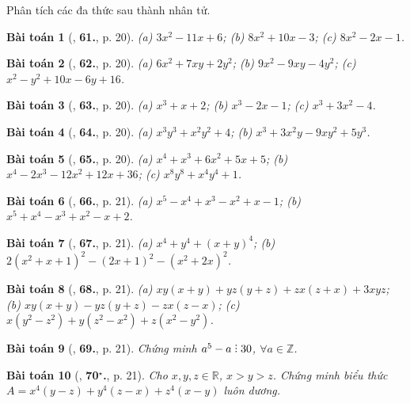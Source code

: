 \documentclass{article}
\numberwithin{equation}{section}
\newtheorem{baitoan}{Bài toán}
\DeclareRobustCommand{\divby}{%
	\mathrel{\vbox{\baselineskip.65ex\lineskiplimit0pt\hbox{.}\hbox{.}\hbox{.}}}%
}
\begin{document}
Phân tích các đa thức sau thành nhân tử.

\begin{baitoan}[\cite{Tuyen_Toan_8}, \textbf{61.}, p. 20]
	(a) $3x^2 - 11x + 6$; (b) $8x^2 + 10x - 3$; (c) $8x^2 - 2x - 1$.
\end{baitoan}

\begin{baitoan}[\cite{Tuyen_Toan_8}, \textbf{62.}, p. 20]
	(a) $6x^2 + 7xy + 2y^2$; (b) $9x^2 - 9xy - 4y^2$; (c) $x^2 - y^2 + 10x - 6y + 16$.
\end{baitoan}

\begin{baitoan}[\cite{Tuyen_Toan_8}, \textbf{63.}, p. 20]
	(a) $x^3 + x + 2$; (b) $x^3 - 2x - 1$; (c) $x^3 + 3x^2 - 4$.
\end{baitoan}

\begin{baitoan}[\cite{Tuyen_Toan_8}, \textbf{64.}, p. 20]
	(a) $x^3y^3 + x^2y^2 + 4$; (b) $x^3 + 3x^2y - 9xy^2 + 5y^3$.
\end{baitoan}

\begin{baitoan}[\cite{Tuyen_Toan_8}, \textbf{65.}, p. 20]
	(a) $x^4 + x^3 + 6x^2 + 5x + 5$; (b) $x^4 - 2x^3 - 12x^2 + 12x + 36$; (c) $x^8y^8 + x^4y^4 + 1$.
\end{baitoan}

\begin{baitoan}[\cite{Tuyen_Toan_8}, \textbf{66.}, p. 21]
	(a) $x^5 - x^4 + x^3 - x^2 + x - 1$; (b) $x^5 + x^4 - x^3 + x^2 - x + 2$.
\end{baitoan}

\begin{baitoan}[\cite{Tuyen_Toan_8}, \textbf{67.}, p. 21]
	(a) $x^4 + y^4 + (x + y)^4$; (b) $2(x^2 + x + 1)^2 - (2x + 1)^2 - (x^2 + 2x)^2$.
\end{baitoan}

\begin{baitoan}[\cite{Tuyen_Toan_8}, \textbf{68.}, p. 21]
	(a) $xy(x + y) + yz(y + z) + zx(z + x) + 3xyz$; (b) $xy(x + y) - yz(y + z) - zx(z - x)$; (c) $x(y^2 - z^2) + y(z^2 - x^2) + z(x^2 - y^2)$.
\end{baitoan}

\begin{baitoan}[\cite{Tuyen_Toan_8}, \textbf{69.}, p. 21]
	Chứng minh $a^5 - a\divby30$, $\forall a\in\mathbb{Z}$.
\end{baitoan}

\begin{baitoan}[\cite{Tuyen_Toan_8}, \textbf{70${}^\star$.}, p. 21]
	Cho $x,y,z\in\mathbb{R}$, $x > y > z$. Chứng minh biểu thức $A = x^4(y - z) + y^4(z - x) + z^4(x - y)$ luôn dương.
\end{baitoan}
\end{document}
